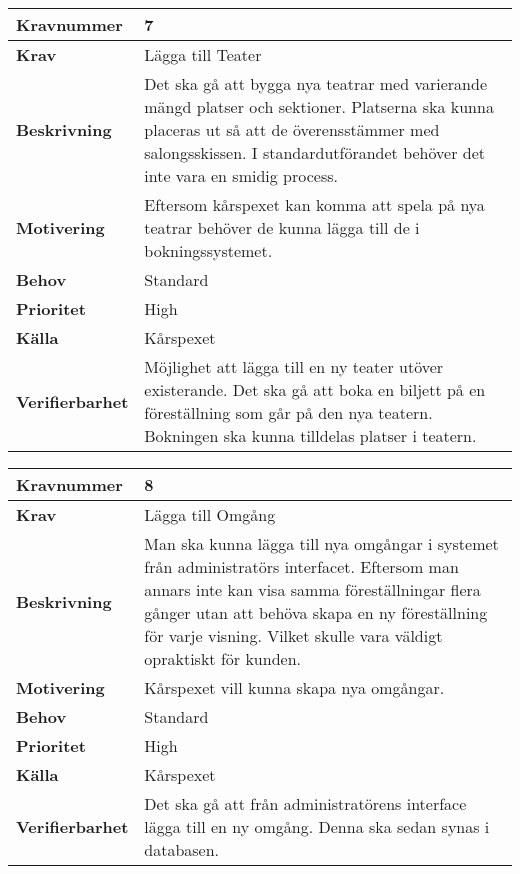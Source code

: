 \documentclass[a4paper, twoside, 11pt, titlepage]{article}
\begin{document}
\begin{tabular} { | p{3cm} | p{12.2cm} | }
	\hline
	\textbf{Kravnummer} & 7  \\
	\hline
	\textbf{Krav} & Lägga till Teater  \\
	\hline
	\textbf{Beskrivning} & Det ska gå att bygga nya teatrar med varierande mängd platser och sektioner. Platserna ska kunna placeras ut så att de överensstämmer med salongsskissen. I standardutförandet behöver det inte vara en smidig process.  \\
	\hline
	\textbf{Motivering} & Eftersom kårspexet kan komma att spela på nya teatrar behöver de kunna lägga till de i bokningssystemet.  \\
	\hline
	\textbf{Behov} & Standard  \\
	\hline
	\textbf{Prioritet} & High  \\
	\hline
	\textbf{Källa} & Kårspexet  \\
	\hline
	\textbf{Verifierbarhet} & Möjlighet att lägga till en ny teater utöver existerande. Det ska gå att boka en biljett på en föreställning som går på den nya teatern. Bokningen ska kunna tilldelas platser i teatern.  \\
	\hline
\end{tabular}

\begin{tabular} { | p{3cm} | p{12.2cm} | }
	\hline
	\textbf{Kravnummer} & 8  \\
	\hline
	\textbf{Krav} & Lägga till Omgång  \\
	\hline
	\textbf{Beskrivning} & Man ska kunna lägga till nya omgångar i systemet från administratörs interfacet. Eftersom man annars inte kan visa samma föreställningar flera gånger utan att behöva skapa en ny föreställning för varje visning. Vilket skulle vara väldigt opraktiskt för kunden.   \\
	\hline
	\textbf{Motivering} & Kårspexet vill kunna skapa nya omgångar.  \\
	\hline
	\textbf{Behov} & Standard  \\
	\hline
	\textbf{Prioritet} & High  \\
	\hline
	\textbf{Källa} & Kårspexet  \\
	\hline
	\textbf{Verifierbarhet} & Det ska gå att från administratörens interface lägga till en ny omgång. Denna ska sedan synas i databasen.   \\
	\hline
\end{tabular}
\end{document}
